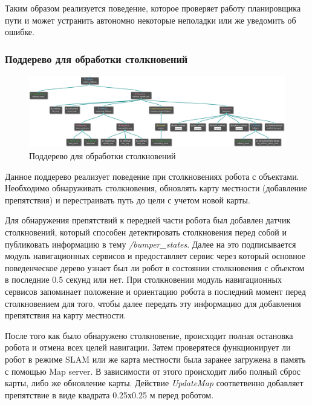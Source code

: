 Таким образом реализуется поведение, которое проверяет работу планировщика пути и может устранить автономно некоторые неполадки или же уведомить об ошибке.

\subsubsection{Поддерево для обработки столкновений}

\begin{figure}[h]
    \centering
    \includegraphics[width=1.0\textwidth]{images/chap_3/collision_subtree.png}
    \caption{Поддерево для обработки столкновений}
    \label{fig:collision_subtree}
\end{figure}

Данное поддерево реализует поведение при столкновениях робота с объектами. \\
Необходимо обнаруживать столкновения, обновлять карту местности (добавление препятствия) и перестраивать путь до цели с учетом новой карты.

Для обнаружения препятствий к передней части робота был добавлен датчик столкновений, который способен детектировать столкновения перед собой и публиковать информацию в тему \textit{/bumper\_states}. Далее на это подписывается модуль навигационных сервисов и предоставляет сервис через который основное поведенческое дерево узнает был ли робот в состоянии столкновения с объектом в последние 0.5 секунд или нет. При столкновении модуль навигационных сервисов запоминает положение и ориентацию робота в последний момент перед столкновением для того, чтобы далее передать эту информацию для добавления препятствия на карту местности. 

После того как было обнаружено столкновение, происходит полная остановка робота и отмена всех целей навигации. Затем проверятеся функционирует ли робот в режиме SLAM или же карта местности была заранее загружена в память с помощью Map server. В зависимости от этого происходит либо полный сброс карты, либо же обновление карты.
Действие \textit{UpdateMap} соответвенно добавляет препятствие в виде квадрата 0.25х0.25 м перед роботом.


